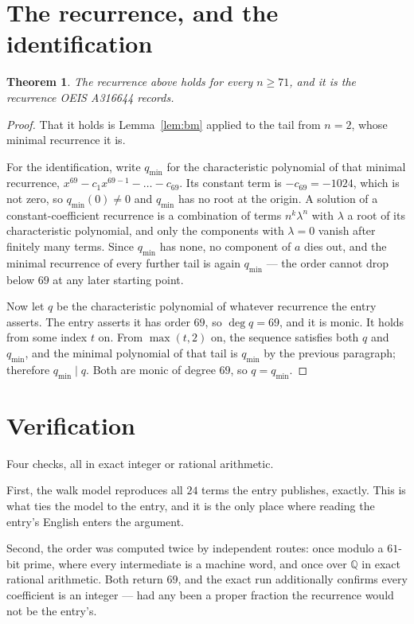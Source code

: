 \documentclass[11pt,a4paper]{article}
\theoremstyle{plain}
\newtheorem{theorem}{Theorem}
\theoremstyle{definition}
\begin{document}
\section{The recurrence, and the identification}

\begin{theorem}
The recurrence above holds for every $n\ge71$, and it is the recurrence OEIS A316644 records.
\end{theorem}

\begin{proof}
That it holds is Lemma~\ref{lem:bm} applied to the tail from $n=2$, whose minimal
recurrence it is.

For the identification, write $q_{\min}$ for the characteristic polynomial of that minimal
recurrence, $x^{69}-c_1x^{69-1}-\dots-c_{69}$. Its constant term is
$-c_{69}=-1024$, which is not zero, so $q_{\min}(0)\neq0$ and $q_{\min}$ has no
root at the origin. A solution of a constant-coefficient recurrence is a combination of terms
$n^{k}\lambda^{n}$ with $\lambda$ a root of its characteristic polynomial, and only the
components with $\lambda=0$ vanish after finitely many terms. Since $q_{\min}$ has none, no
component of $a$ dies out, and the minimal recurrence of every further tail is again
$q_{\min}$ --- the order cannot drop below $69$ at any later starting point.

Now let $q$ be the characteristic polynomial of whatever recurrence the entry asserts. The
entry asserts it has order $69$, so $\deg q=69$, and it is monic. It holds from some
index $t$ on. From $\max(t,2)$ on, the sequence satisfies both $q$ and $q_{\min}$, and
the minimal polynomial of that tail is $q_{\min}$ by the previous paragraph; therefore
$q_{\min}\mid q$. Both are monic of degree $69$, so $q=q_{\min}$.
\end{proof}

\section{Verification}

Four checks, all in exact integer or rational arithmetic.

First, the walk model reproduces all $24$ terms the entry publishes, exactly. This is
what ties the model to the entry, and it is the only place where reading the entry's English
enters the argument.

Second, the order was computed twice by independent routes: once modulo a $61$-bit prime, where
every intermediate is a machine word, and once over $\mathbb{Q}$ in exact rational arithmetic.
Both return $69$, and the exact run additionally confirms every coefficient is an integer
--- had any been a proper fraction the recurrence would not be the entry's.
\end{document}
